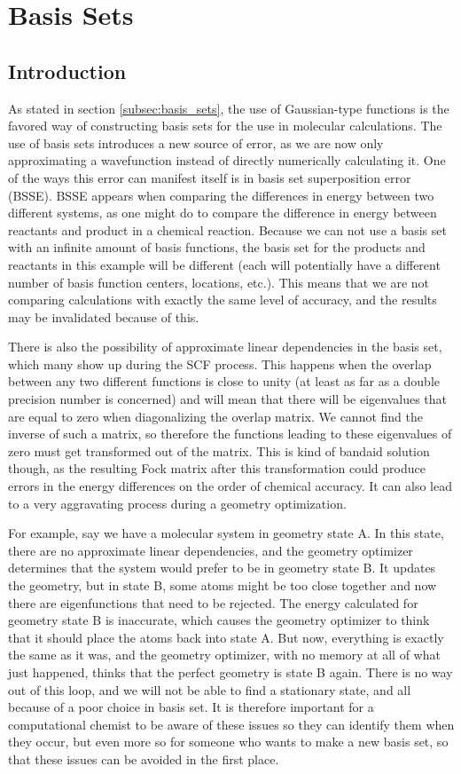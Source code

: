 \chapter{Basis Sets}
\label{chap:basis_sets}
\section{Introduction}
As stated in section \ref{subsec:basis_sets}, the use of Gaussian-type functions is the favored way of constructing basis sets for the use in molecular calculations. The use of basis sets introduces a new source of error, as we are now only approximating a wavefunction instead of directly numerically calculating it. One of the ways this error can manifest itself is in basis set superposition error (BSSE). BSSE appears when comparing the differences in energy between two different systems, as one might do to compare the difference in energy between reactants and product in a chemical reaction. Because we can not use a basis set with an infinite amount of basis functions, the basis set for the products and reactants in this example will be different (each will potentially have a different number of basis function centers, locations, etc.). This means that we are not comparing calculations with exactly the same level of accuracy, and the results may be invalidated because of this. 

There is also the possibility of approximate linear dependencies in the basis set, which many show up during the SCF process. This happens when the overlap between any two different functions is close to unity (at least as far as a double precision number is concerned) and will mean that there will be eigenvalues that are equal to zero when diagonalizing the overlap matrix. We cannot find the inverse of such a matrix, so therefore the functions leading to these eigenvalues of zero must get transformed out of the matrix. This is kind of bandaid solution though, as the resulting Fock matrix after this transformation could produce errors in the energy differences on the order of chemical accuracy. It can also lead to a very aggravating process during a geometry optimization. 

For example, say we have a molecular system in geometry state A. In this state, there are no approximate linear dependencies, and the geometry optimizer determines that the system would prefer to be in geometry state B. It updates the geometry, but in state B, some atoms might be too close together and now there are eigenfunctions that need to be rejected. The energy calculated for geometry state B is inaccurate, which causes the geometry optimizer to think that it should place the atoms back into state A. But now, everything is exactly the same as it was, and the geometry optimizer, with no memory at all of what just happened, thinks that the perfect geometry is state B again. There is no way out of this loop, and we will not be able to find a stationary state, and all because of a poor choice in basis set. It is therefore important for a computational chemist to be aware of these issues so they can identify them when they occur, but even more so for someone who wants to make a new basis set, so that these issues can be avoided in the first place.

